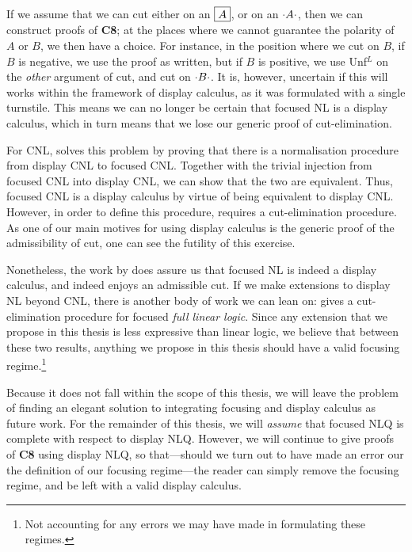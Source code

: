 If we assume that we can cut either on an $\boxed{A}$, or on an
${\cdot}A{\cdot}$, then we can construct proofs of \textbf{C8}; at the
places where we cannot guarantee the polarity of $A$ or $B$, we then
have a choice. For instance, in the position where we cut on $B$, if
$B$ is negative, we use the proof as written, but if $B$ is positive,
we use Unf$^L$ on the \emph{other} argument of cut, and cut on
${\cdot}B{\cdot}$. It is, however, uncertain if this will works within the
framework of display calculus, as it was formulated with a single
turnstile.
This means we can no longer be certain that focused NL is a display
calculus, which in turn means that we lose our generic proof of
cut-elimination.

For CNL, \citet{bastenhof2011} solves this problem by proving that
there is a normalisation procedure from display CNL to focused CNL.
Together with the trivial injection from focused CNL into display CNL,
we can show that the two are equivalent.
Thus, focused CNL is a display calculus by virtue of being equivalent
to display CNL. However, in order to define this procedure,
\citet{bastenhof2011} requires a cut-elimination procedure. As one of
our main motives for using display calculus is the generic proof of
the admissibility of cut, one can see the futility of this exercise.

Nonetheless, the work by \citeauthor{bastenhof2011} does assure us
that focused NL is indeed a display calculus, and indeed enjoys
an admissible cut.
If we make extensions to display NL beyond CNL, there is another body
of work we can lean on: \citet{andreoli1992} gives a cut-elimination
procedure for focused \emph{full linear logic}. Since any extension
that we propose in this thesis is less expressive than linear logic,
we believe that between these two results, anything we propose in this
thesis should have a valid focusing regime.\footnote{%
  Not accounting for any errors we may have made in formulating these
  regimes.
}

Because it does not fall within the scope of this thesis, we will
leave the problem of finding an elegant solution to integrating
focusing and display calculus as future work.
For the remainder of this thesis, we will \emph{assume} that focused
NLQ is complete with respect to display NLQ.
However, we will continue to give proofs of 
\textbf{C8} using display NLQ, so that---should we turn out to have
made an error our the definition of our focusing regime---the reader
can simply remove the focusing regime, and be left with a valid
display calculus.
